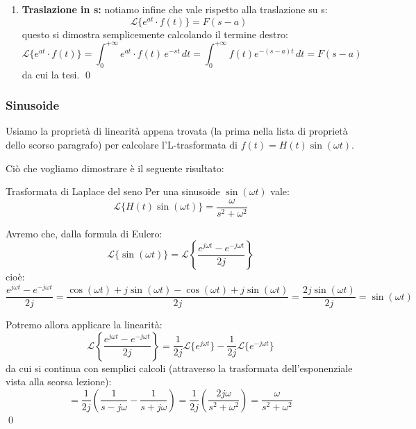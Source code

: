 \documentclass[a4paper,11pt]{article}
\begin{document}
\begin{enumerate}
		Un modo alternativo di dimostrare lo stesso risultato è tramite l'applicazione ripetuta della legge di integrazione per parti.
		Al primo passaggio si ha:
		$$
		\mathcal{L} \left\{ \frac{t^k}{k!} \cdot H(t) \right\} = \int_0^{+\infty} \frac{t^k}{k!} e^{-st} \, dt = t^{k - 1} e^{-st} \Big|^{+\infty}_0 + \int_0^{+\infty} \frac{t^{k - 1}e^{-st}}{s} \, dt
		$$
		dove il termine $t^{k - 1} e^{-st} \big|^{+\infty}_0$ si annulla. 
		Vediamo quindi che per il grado $k$ si ripete il procedimento $k$ volte ottenendo:
		$$
		\rightsquigarrow^k \int_0^{+\infty} \frac{e^{-st}}{s^k} \, dt = \frac{1}{s^{k + 1}}
		$$
		che è nuovamente la tesi. \qed

	\item \textbf{Traslazione in s:} notiamo infine che vale rispetto alla traslazione su s:
		$$
		\mathcal{L}\{ e^{at} \cdot f(t) \} = F(s - a) 
		$$
		questo si dimostra semplicemente calcolando il termine destro:
		$$
		\mathcal{L}\{ e^{at} \cdot f(t) \} = \int_0^{+\infty} e^{at} \cdot f(t) \, e^{-st} \, dt = \int_0^{+\infty} f(t) e^{-(s - a)t} \, dt = F(s - a)
		$$ 
		da cui la tesi. \qed
\end{enumerate}

\subsubsection{Sinusoide}
Usiamo la proprietà di linearità appena trovata (la prima nella lista di proprietà dello scorso paragrafo) per calcolare l'L-trasformata di $f(t) = H(t)\sin(\omega t)$.

Ciò che vogliamo dimostrare è il seguente risultato:
\begin{theorem}{Trasformata di Laplace del seno}
	Per una sinusoide $\sin(\omega t)$ vale:
	$$
		\mathcal{L}\{ H(t) \sin(\omega t) \} = \frac{\omega}{s^2 + \omega^2}
	$$
\end{theorem}

Avremo che, dalla formula di Eulero:
$$
\mathcal{L}\{\sin(\omega t)\} = \mathcal{L}\left\{ \frac{e^{j \omega t} - e^{- j \omega t}}{2j} \right\}
$$
cioè:
$$
\frac{e^{j \omega t} - e^{-j \omega t}}{2j} = \frac{ \cos(\omega t) + j \sin(\omega t) - \cos(\omega t) + j \sin(\omega t) }{2j} = \frac{2j \sin(\omega t)}{2j} = \sin(\omega t)
$$

Potremo allora applicare la linearità:
$$
\mathcal{L}\left\{ \frac{e^{j \omega t} - e^{- j \omega t}}{2j} \right\} = \frac{1}{2j} \mathcal{L}\{e^{j \omega t}\} - \frac{1}{2j} \mathcal{L}\{e^{-j \omega t}\}
$$
da cui si continua con semplici calcoli (attraverso la trasformata dell'esponenziale vista alla scorsa lezione):
$$
= \frac{1}{2j}\left( \frac{1}{s - j\omega} - \frac{1}{s + j \omega} \right) = \frac{1}{2j}\left( \frac{2j\omega}{s^2 + \omega^2} \right) = \frac{\omega}{s^2 + \omega^2}
$$ \qed
\end{document}
